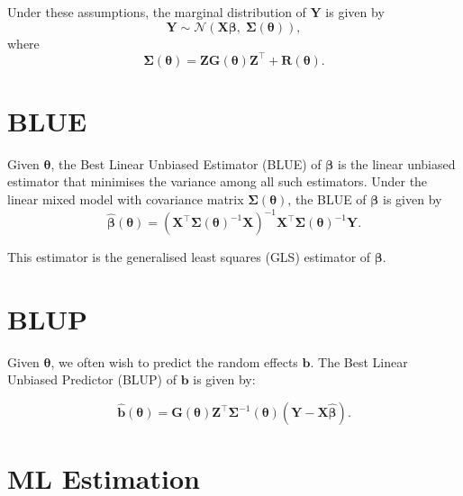 \documentclass[
  letterpaper,
  DIV=11,
  numbers=noendperiod]{scrartcl}
\begin{document}
Under these assumptions, the marginal distribution of \(\symbf{Y}\) is
given by \begin{equation}
\symbf{Y} \sim \mathcal{N}\left(\symbf{X}\symbf{\beta},\; \symbf{\Sigma}(\symbf{\theta})\right),
\end{equation} where \begin{equation}
\label{eq-sigma}
\symbf{\Sigma}(\symbf{\theta}) = \symbf{Z}\symbf{G}(\symbf{\theta})\symbf{Z}^\top + \symbf{R}(\symbf{\theta}).
\end{equation}

\section{BLUE}\label{blue}

Given \(\symbf{\theta}\), the Best Linear Unbiased Estimator (BLUE) of
\(\symbf{\beta}\) is the linear unbiased estimator that minimises the
variance among all such estimators. Under the linear mixed model with
covariance matrix \(\symbf{\Sigma}(\symbf{\theta})\), the BLUE of
\(\symbf{\beta}\) is given by \begin{equation}
\widehat{\symbf{\beta}}(\symbf{\theta})
=
\left(\symbf{X}^\top \symbf{\Sigma}(\symbf{\theta})^{-1} \symbf{X}\right)^{-1}
\symbf{X}^\top \symbf{\Sigma}(\symbf{\theta})^{-1} \symbf{Y}.
\end{equation}

This estimator is the generalised least squares (GLS) estimator of
\(\symbf{\beta}\).

\section{BLUP}\label{blup}

Given \(\symbf{\theta}\), we often wish to predict the random effects
\(\symbf{b}\). The Best Linear Unbiased Predictor (BLUP) of
\(\symbf{b}\) is given by:

\begin{equation}
\widehat{\symbf{b}}(\symbf{\theta}) = \symbf{G}(\symbf{\theta})\symbf{Z}^\top \symbf{\Sigma}^{-1}(\symbf{\theta}) (\symbf{Y} - \symbf{X}\widehat{\symbf{\beta}}).
\label{eq:blup}
\end{equation}

\section{ML Estimation}\label{ml-estimation}
\end{document}
